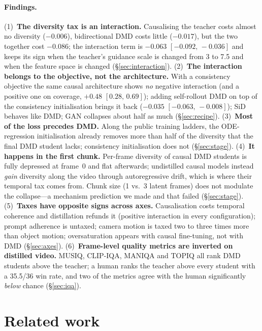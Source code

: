 \documentclass[10pt,twocolumn,letterpaper]{article}
\newcommand{\ci}[2]{[#1,\,#2]}
\begin{document}
\paragraph{Findings.} (1)~\textbf{The diversity tax is an interaction.} Causalising the teacher costs almost no diversity ($-0.006$), bidirectional DMD costs little ($-0.017$), but the two together cost $-0.086$; the interaction term is $-0.063$ $\ci{-0.092}{-0.036}$ and keeps its sign when the teacher's guidance scale is changed from 3 to 7.5 and when the feature space is changed (\S\ref{sec:interaction}). (2)~\textbf{The interaction belongs to the objective, not the architecture.} With a consistency objective the same causal architecture shows \emph{no} negative interaction (and a positive one on coverage, $+0.48$ $\ci{0.28}{0.69}$); adding self-rollout DMD on top of the consistency initialisation brings it back ($-0.035$ $\ci{-0.063}{-0.008}$); SiD behaves like DMD; GAN collapses about half as much (\S\ref{sec:recipe}). (3)~\textbf{Most of the loss precedes DMD.} Along the public training ladders, the ODE-regression initialisation already removes more than half of the diversity that the final DMD student lacks; consistency initialisation does not (\S\ref{sec:stage}). (4)~\textbf{It happens in the first chunk.} Per-frame diversity of causal DMD students is fully depressed at frame~0 and flat afterwards; undistilled causal models instead \emph{gain} diversity along the video through autoregressive drift, which is where their temporal tax comes from. Chunk size (1 vs.\ 3 latent frames) does not modulate the collapse---a mechanism prediction we made and that failed (\S\ref{sec:stage}). (5)~\textbf{Taxes have opposite signs across axes.} Causalisation costs temporal coherence and distillation refunds it (positive interaction in every configuration); prompt adherence is untaxed; camera motion is taxed two to three times more than object motion; oversaturation appears with causal fine-tuning, not with DMD (\S\ref{sec:axes}). (6)~\textbf{Frame-level quality metrics are inverted on distilled video.} MUSIQ, CLIP-IQA, MANIQA and TOPIQ all rank DMD students above the teacher; a human ranks the teacher above every student with a 35.5/36 win rate, and two of the metrics agree with the human significantly \emph{below} chance (\S\ref{sec:iqa}).

\section{Related work}
\end{document}
